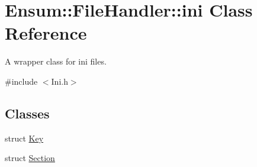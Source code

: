 \hypertarget{class_ensum_1_1_file_handler_1_1ini}{}\section{Ensum\+:\+:File\+Handler\+:\+:ini Class Reference}
\label{class_ensum_1_1_file_handler_1_1ini}


A wrapper class for ini files.  




{\ttfamily \#include $<$Ini.\+h$>$}

\subsection*{Classes}
\begin{DoxyCompactItemize}
\item 
struct \hyperlink{struct_ensum_1_1_file_handler_1_1ini_1_1_key}{Key}
\item 
struct \hyperlink{struct_ensum_1_1_file_handler_1_1ini_1_1_section}{Section}
\end{DoxyCompactItemize}
